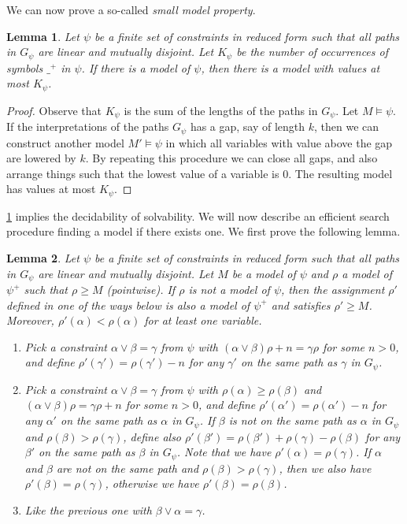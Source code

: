\documentclass[11pt,a4paper]{article}
\newtheorem{lemma}{Lemma}[theorem]
\begin{document}
We can now prove a so-called \emph{small model property}.
\begin{lemma}\label{lem:small-model}
Let   $\psi$ be a finite set of constraints in reduced form such that all paths in $G_ \psi$ are linear
and mutually disjoint. Let $K_{ \psi}$ be the number of occurrences of symbols $\_^+$ in  $\psi$.
If there is a model of  $\psi$, then there is a model with values at most $K_{ \psi}$.
\end{lemma}

\begin{proof}
Observe that $K_{ \psi}$ is the sum of the lengths of the paths in $G_ \psi$.
Let $M \models \psi$. If the interpretations of the paths $G_ \psi$
has a gap, say of length $k$, then we can construct another model $M' \models \psi$
in which all variables with value above the gap are lowered by $k$. By repeating this procedure we can close all gaps, and also arrange things such that
the lowest value of a variable is $0$. The resulting model
has values at most $K_{ \psi}$.
\end{proof}

\cref{lem:small-model} implies the decidability of solvability.
We will now describe an efficient search procedure finding a
model if there exists one. We first prove the following lemma.

\begin{lemma}\label{lem:model-search}
Let   $\psi$ be a finite set of constraints in reduced form such that all paths 
in $G_ \psi$ are linear and mutually disjoint.
Let $M$ be a model of  $\psi$ and $\rho$ a model of $ \psi^+$ such that $\rho\geq M$ (pointwise).
If $\rho$ is not a model of  $\psi$, then the assignment $\rho'$ defined in 
one of the ways below is also a model of $ \psi^+$ and satisfies $\rho'\geq M$.
Moreover, $\rho'(\alpha)<\rho(\alpha)$ for at least one variable.
\begin{enumerate}
\item Pick a constraint $\alpha\vee\beta = \gamma$ from  $\psi$ with
$(\alpha\vee\beta)\rho +n = \gamma\rho$ for some $n>0$, and define 
$\rho'(\gamma') = \rho(\gamma')-n$ for any $\gamma'$ on the same path as $\gamma$ in $G_ \psi$.
\item Pick a constraint $\alpha\vee\beta = \gamma$ from  $\psi$ with $\rho(\alpha)\geq\rho(\beta)$
and $(\alpha\vee\beta)\rho = \gamma\rho +n$ for some $n>0$, and  define 
$\rho'(\alpha') = \rho(\alpha') -n$ for any $\alpha'$ on the same path as $\alpha$ in $G_ \psi$.
If $\beta$ is not on the same path as $\alpha$ in $G_ \psi$ and $\rho(\beta)>\rho(\gamma)$, define also
$\rho'(\beta') = \rho(\beta') + \rho(\gamma) - \rho(\beta)$ 
for any $\beta'$ on the same path as $\beta$ in $G_ \psi$. Note that we have
$\rho'(\alpha) = \rho(\gamma)$. If $\alpha$ and $\beta$ are
not on the same path and $\rho(\beta)>\rho(\gamma)$, then we also have
$\rho'(\beta) = \rho(\gamma)$, otherwise we have $\rho'(\beta) = \rho(\beta)$.
\item Like the previous one with $\beta\vee\alpha = \gamma$.
\end{enumerate}
\end{lemma}
\end{document}
